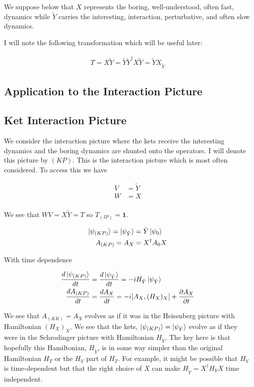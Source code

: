 \documentclass[12pt]{article}
\newcommand{\ddt}[1]{\frac{d #1}{dt}}
\newcommand{\ppt}[1]{\frac{\partial #1}{\partial t}}
\newcommand{\bv}[1]{\boldsymbol{#1}}
\begin{document}
We suppose below that $X$ represents the boring, well-understood, often fast, dynamics while $\tilde{Y}$ carries the interesting, interaction, perturbative, and often slow dynamics.

I will note the following transformation which will be useful later:

\begin{align}
T = X\tilde{Y} = \tilde{Y}\tilde{Y}^{\dag} X \tilde{Y} = \tilde{Y} X_{\tilde{Y}}
\end{align}
\subsection{Application to the Interaction Picture}

\subsection{Ket Interaction Picture}

We consider the interaction picture where the kets receive the interesting dynamics and the boring dynamics are shunted onto the operators. I will denote this picture by $(KP)$. This is the interaction picture which is most often considered. To access this we have

\begin{align}
V &= \tilde{Y}\\
W &= X\\
\end{align}

We see that $WV = X\tilde{Y} = T$ so $T_{(IP)} = \bv{1}$.

\begin{align}
\ket{\psi_{(KP)}} = \ket{\psi_{\tilde{Y}}}&= \tilde{Y} \ket{\psi_0}\\
A_{(KP)} = A_X &= X^{\dag} A_0 X
\end{align}

With time dependence

\begin{align}
\ddt{\ket{\psi_{(KP)}}} &= \ddt{\ket{\psi_{\tilde{Y}}}} = -i H_{\tilde{Y}} \ket{\psi_{\tilde{Y}}}\\
\ddt{A_{(KP)}} &= \ddt{A_X} =  -i[A_X, (H_X)_X] + \ppt{A_X}\\
\end{align}

We see that $A_{(KK)} = A_X$ evolves as if it was in the Heisenberg picture with Hamiltonian $(H_X)_X$. We see that the kets, $\ket{\psi_{(KP)}} = \ket{\psi_{\tilde{Y}}}$ evolve as if they were in the Schrodinger picture with Hamiltonian $H_{\tilde{Y}}$. The key here is that hopefully this Hamiltonian, $H_{\tilde{Y}}$, is in some way simpler than the original Hamiltonian $H_T$ or the $H_Y$ part of $H_T$. For example, it might be possible that $H_Y$ is time-dependent but that the right choice of $X$ can make $H_{\tilde{Y}} = X^{\dag} H_Y X$ time independent.
\end{document}

